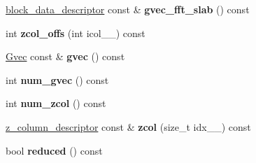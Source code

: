 \begin{DoxyCompactItemize}
\item 
\hypertarget{classsddk_1_1_gvec__partition_ad61680f59aa0f188ab36e4636d894bc7}{}\hyperlink{structsddk_1_1block__data__descriptor}{block\+\_\+data\+\_\+descriptor} const \& {\bfseries gvec\+\_\+fft\+\_\+slab} () const \label{classsddk_1_1_gvec__partition_ad61680f59aa0f188ab36e4636d894bc7}

\item 
\hypertarget{classsddk_1_1_gvec__partition_a2d4e86b30cda53bc5e97053549ede15e}{}int {\bfseries zcol\+\_\+offs} (int icol\+\_\+\+\_\+) const \label{classsddk_1_1_gvec__partition_a2d4e86b30cda53bc5e97053549ede15e}

\item 
\hypertarget{classsddk_1_1_gvec__partition_a76ab14714aad2c0c117f33ab9917c65b}{}\hyperlink{classsddk_1_1_gvec}{Gvec} const \& {\bfseries gvec} () const \label{classsddk_1_1_gvec__partition_a76ab14714aad2c0c117f33ab9917c65b}

\item 
\hypertarget{classsddk_1_1_gvec__partition_a767d12abd63314695d174cb76a25bebf}{}int {\bfseries num\+\_\+gvec} () const \label{classsddk_1_1_gvec__partition_a767d12abd63314695d174cb76a25bebf}

\item 
\hypertarget{classsddk_1_1_gvec__partition_a8ea2d4b5faa98c951ec7aea575d96b7b}{}int {\bfseries num\+\_\+zcol} () const \label{classsddk_1_1_gvec__partition_a8ea2d4b5faa98c951ec7aea575d96b7b}

\item 
\hypertarget{classsddk_1_1_gvec__partition_af4e802733249672b35923761d96a64e0}{}\hyperlink{structsddk_1_1z__column__descriptor}{z\+\_\+column\+\_\+descriptor} const \& {\bfseries zcol} (size\+\_\+t idx\+\_\+\+\_\+) const \label{classsddk_1_1_gvec__partition_af4e802733249672b35923761d96a64e0}

\item 
\hypertarget{classsddk_1_1_gvec__partition_a880e5826fdcc283800acb5f8dd0795c5}{}bool {\bfseries reduced} () const \label{classsddk_1_1_gvec__partition_a880e5826fdcc283800acb5f8dd0795c5}

\end{DoxyCompactItemize}
